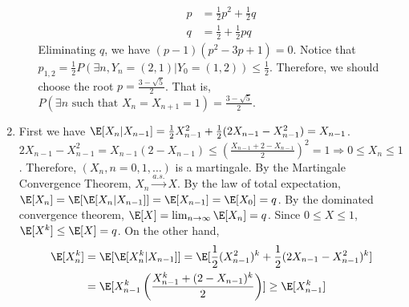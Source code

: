 \documentclass{article}
\begin{document}
\begin{enumerate}
\begin{enumerate}
\begin{align*}
    p &= \frac{1}{2} p^2 + \frac{1}{2}q \\
    q &=\frac{1}{2} + \frac{1}{2} pq
\end{align*}
Eliminating $q$, we have $(p-1)(p^2 - 3p+1)=0$.
Notice that $p_{1,2}=\frac{1}{2}P(\exists n,
Y_{n}=(2,1)|Y_0=(1,2)) \leq \frac{1}{2}$.
Therefore, we should choose the root
$p=\frac{3-\sqrt{5}}{2}$. That is,
$P(\exists n \textrm{ such that } X_n = X_{n+1} = 1) =\frac{3-\sqrt{5}}{2}$.
\end{enumerate}
\item First we have $\E[X_n | X_{n-1}] = \frac{1}{2}
X_{n-1}^2 + \frac{1}{2} (2X_{n-1} - X^2_{n-1})
= X_{n-1}$. $2X_{n-1} - X^2_{n-1}
=X_{n-1}(2-X_{n-1}) \leq (\frac{X_{n-1} + 2 - X_{n-1}}{2})^2=1 \Rightarrow 0 \leq X_n \leq 1$. Therefore, $(X_n,n=0,1,\dots)$ is a martingale. By the Martingale Convergence
Theorem, $X_n \xrightarrow{a.s.} X$.
By the law of total expectation,
$\E[X_n]=\E[\E[X_n|X_{n-1}]] = \E[X_{n-1}]=\E[X_0]=q$.
By the dominated convergence theorem,
$\E[X]=\lim_{n\to \infty} \E[X_n]=q$.
Since $0\leq X \leq 1$, $\E[X^k] \leq \E[X]=q$.
On the other hand,
\begin{align}
    \E[X_{n}^k]
&=\E[\E[X^k_n|X_{n-1}]]
=\E[\frac{1}{2} (X_{n-1}^2)^k
+ \frac{1}{2} (2X_{n-1} - X_{n-1}^2)^k ]
\label{eq:knr}\\
&=\E[X^k_{n-1}\left(
\frac{X_{n-1}^k + (2-X_{n-1})^k}{2}
\right)]
\geq \E[X_{n-1}^k]
\end{align}


\end{enumerate}
\end{document}
